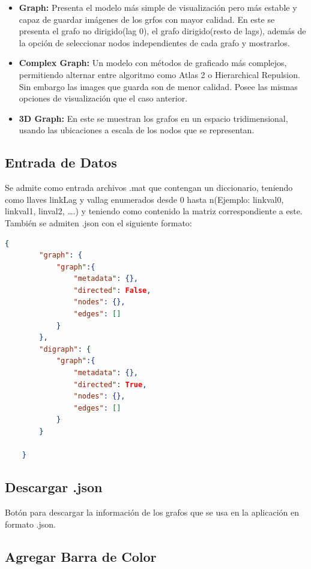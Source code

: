 \documentclass[spanish]{article}
\begin{document}
\begin{itemize}
    \item \textbf{Graph:} Presenta el modelo más simple de visualización pero más estable y capaz de guardar imágenes de los grfos con mayor calidad. En este se presenta el grafo no dirigido(lag 0), el grafo dirigido(resto de lags), además de la opción de seleccionar nodos independientes de cada grafo y mostrarlos.
    \item \textbf{Complex Graph:} Un modelo con métodos de graficado más complejos, permitiendo alternar entre algoritmo como Atlas 2 o Hierarchical Repulsion. Sin embargo las images que guarda son de menor calidad. Posee las mismas opciones de visualización que el caso anterior.
    \item \textbf{3D Graph:} En este se muestran los grafos en un espacio tridimensional, usando las ubicaciones a escala de los nodos que se representan.
\end{itemize}

\subsection*{Entrada de Datos}

Se admite como entrada archivos .mat que contengan un diccionario, teniendo como llaves linkLag y vallag enumerados desde 0 hasta n(Ejemplo: linkval0, linkval1, linval2, ….) y teniendo como contenido la matriz correspondiente a este. También se admiten .json con el siguiente formato:


\begin{lstlisting}[language=json,firstnumber=1]
    {
        "graph": {
            "graph":{
                "metadata": {},
                "directed": False,
                "nodes": {},
                "edges": []
            }
        },
        "digraph": {
            "graph":{
                "metadata": {},
                "directed": True,
                "nodes": {},
                "edges": []
            }
        }
            
    }
    \end{lstlisting}


\subsection*{Descargar .json}

Botón para descargar la información de los grafos que se usa en la aplicación en formato .json.

\subsection*{Agregar Barra de Color}
\end{document}
